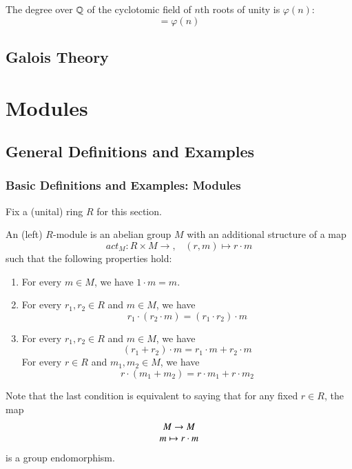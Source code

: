 \documentclass[12pt, a4paper, oneside, openright, titlepage]{book}
\begin{document}
\begin{cor}
    The degree over $\mathbb Q$ of the cyclotomic field of $n$th roots of unity is $\varphi(n)$: \begin{equation*}
        [\Q(\zeta_n):\Q] = \varphi(n)
    \end{equation*}
\end{cor}







\chapter{\textsection\textsection Galois Theory}


\part{Modules}

\chapter{\textsection\textsection General Definitions and Examples}


\section{\textsection Basic Definitions and Examples: Modules}

Fix a (unital) ring $R$ for this section.

\begin{defn}
    An (left) $R$-module is an abelian group $M$ with an additional structure of a map \begin{equation}
        act_M:R\times M \rightarrow,\;\;\;(r,m)\mapsto r\cdot m
    \end{equation}
    such that the following properties hold:\begin{enumerate}
        \item For every $m \in M$, we have $1 \cdot m = m$.
        \item For every $r_1,r_2 \in R$ and $m \in M$, we have $$r_1\cdot(r_2\cdot m) = (r_1\cdot r_2)\cdot m$$
        \item For every $r_1,r_2 \in R$ and $m \in M$, we have $$(r_1+r_2)\cdot m = r_1\cdot m + r_2\cdot m$$
        For every $r \in R$ and $m_1,m_2 \in M$, we have $$r\cdot (m_1+m_2) = r\cdot m_1 + r\cdot m_2$$
    \end{enumerate}
    Note that the last condition is equivalent to saying that for any fixed $r \in R$, the map $$\begin{array}{c} M\rightarrow M \\ m\mapsto r\cdot m \end{array}$$
    is a group endomorphism.
\end{defn}
\end{document}
